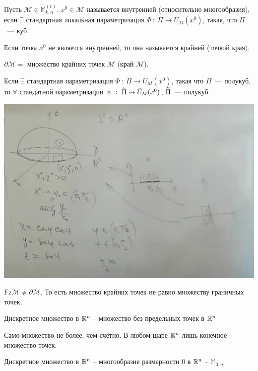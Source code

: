 \begin{definition}
    Пусть $\mathcal M \in \mathbb{M}_{k,n}^{(r)}$.  $x^0 \in \mathcal M$ называется внутренней (относительно многообразия), если $\exists $ стандартная локальная параметризация $\Phi ~:~ \Pi \to U_M(x^0)$, такая, что $\Pi$~--- куб.
\end{definition}

Если точка $x^0$ не является внутренней, то она называется крайней (точкой края).

$\partial \mathcal M = $ множество крайних точек $\mathcal M$ (край $\mathcal M$).

\begin{note}
    Если $\exists$ стандартная параметризация $\Phi ~:~ \Pi \to U_M (x^0)$, такая что $\Pi$~--- полукуб, то $\forall $ стандатной параметризации $\psi ~:~ \widetilde{\Pi} \to \widetilde{U}_M (x^0)$, $\widetilde{\Pi}$~--- полукуб.
\end{note}

\begin{center}
    \includegraphics[scale=0.4]{img/halfsphere-to-extreme-points.png}
\end{center}

\begin{note}
    $\mathrm{Fz} \mathcal M \neq \partial \mathcal M$. То есть множество крайних точек не равно множеству граничных точек.
\end{note}

\begin{definition}
    Дискретное множество в $\mathbb{R}^n$ -- множество без предельных точек в $\mathbb{R}^n$

    Само множество не более, чем счётно. В любом шаре $\mathbb{R}^n$ лишь конечное множество точек.

    Дискретное множество в $\mathbb{R}^n$ -- многообразие размерности $0$ в $\mathbb{R}^n$ -- $\mathbb M_{0, n}$
\end{definition}

